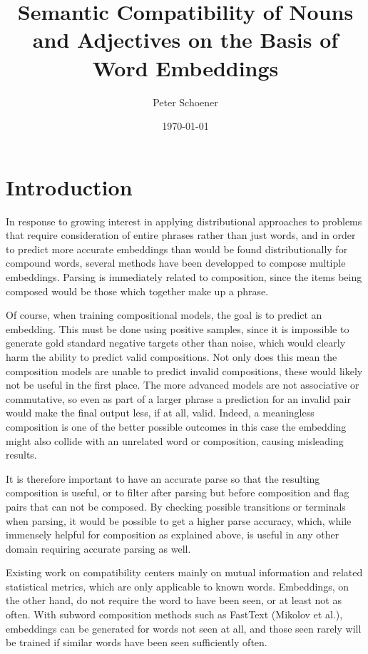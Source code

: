 \documentclass{article}
\begin{document}
\title{Semantic Compatibility of Nouns and Adjectives on the Basis of Word Embeddings}
\author{Peter Schoener}
\date{\today}
\maketitle

\section{Introduction}

In response to growing interest in applying distributional approaches to problems that require consideration of entire phrases rather than just words, and in order to predict more accurate embeddings than would be found distributionally for compound words, several methods have been developped to compose multiple embeddings. Parsing is immediately related to composition, since the items being composed would be those which together make up a phrase.

Of course, when training compositional models, the goal is to predict an embedding. This must be done using positive samples, since it is impossible to generate gold standard negative targets other than noise, which would clearly harm the ability to predict valid compositions. Not only does this mean the composition models are unable to predict invalid compositions, these would likely not be useful in the first place. The more advanced models are not associative or commutative, so even as part of a larger phrase a prediction for an invalid pair would make the final output less, if at all, valid. Indeed, a meaningless composition is one of the better possible outcomes in this case \textemdash the embedding might also collide with an unrelated word or composition, causing misleading results.

It is therefore important to have an accurate parse so that the resulting composition is useful, or to filter after parsing but before composition and flag pairs that can not be composed. By checking possible transitions or terminals when parsing, it would be possible to get a higher parse accuracy, which, while immensely helpful for composition as explained above, is useful in any other domain requiring accurate parsing as well.

Existing work on compatibility centers mainly on mutual information and related statistical metrics, which are only applicable to known words. Embeddings, on the other hand, do not require the word to have been seen, or at least not as often. With subword composition methods such as FastText (Mikolov et al.), embeddings can be generated for words not seen at all, and those seen rarely will be trained if similar words have been seen sufficiently often.
\end{document}
